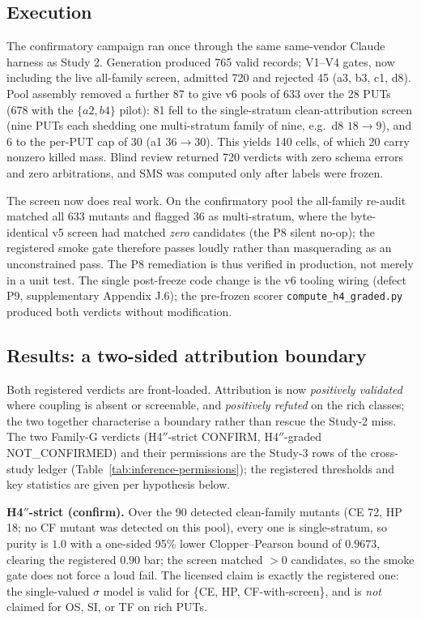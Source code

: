 \documentclass[manuscript,screen,review]{acmart}
\begin{document}
\subsection{Execution}\label{study3-execution}

The confirmatory campaign ran once through the same same-vendor Claude harness
as Study 2. Generation produced 765 valid records; V1--V4 gates, now including
the live all-family screen, admitted 720 and rejected 45 (a3, b3, c1, d8). Pool
assembly removed a further 87 to give v6 pools of 633 over the 28 PUTs (678 with
the \(\{a2, b4\}\) pilot): 81 fell to the single-stratum clean-attribution screen
(nine PUTs each shedding one multi-stratum family of nine, e.g.\ d8 $18\to9$),
and 6 to the per-PUT cap of 30 (a1 $36\to30$). This yields 140 cells, of which
20 carry nonzero killed mass. Blind review returned 720 verdicts with zero schema
errors and zero arbitrations, and SMS was computed only after labels were frozen.

The screen now does real work. On the confirmatory pool the all-family re-audit
matched all 633 mutants and flagged 36 as multi-stratum, where the
byte-identical v5 screen had matched \emph{zero} candidates (the P8 silent
no-op); the registered smoke gate therefore passes loudly rather than
masquerading as an unconstrained pass. The P8 remediation is thus verified in
production, not merely in a unit test. The single post-freeze code change is the
v6 tooling wiring (defect P9, supplementary Appendix J.6); the pre-frozen scorer
\texttt{compute\_h4\_graded.py} produced both verdicts without modification.

\subsection{Results: a two-sided attribution boundary}\label{study3-scoreboard}

Both registered verdicts are front-loaded. Attribution is now \emph{positively
validated} where coupling is absent or screenable, and \emph{positively refuted}
on the rich classes; the two together characterise a boundary rather than rescue
the Study-2 miss. The two Family-G verdicts (H4\('' \)-strict CONFIRM,
H4\('' \)-graded NOT\_CONFIRMED) and their permissions are the Study-3 rows of
the cross-study ledger (Table~\ref{tab:inference-permissions}); the registered
thresholds and key statistics are given per hypothesis below.

\textbf{H4\('' \)-strict (confirm).} Over the 90 detected clean-family mutants
(CE 72, HP 18; no CF mutant was detected on this pool), every one is
single-stratum, so purity is \(1.0\) with a one-sided 95\% lower
Clopper--Pearson bound of \(0.9673\), clearing the registered \(0.90\) bar; the
screen matched \(>0\) candidates, so the smoke gate does not force a loud fail.
The licensed claim is exactly the registered one: the single-valued \(\sigma\)
model is valid for \{CE, HP, CF-with-screen\}, and is \emph{not} claimed for
OS, SI, or TF on rich PUTs.
\end{document}
